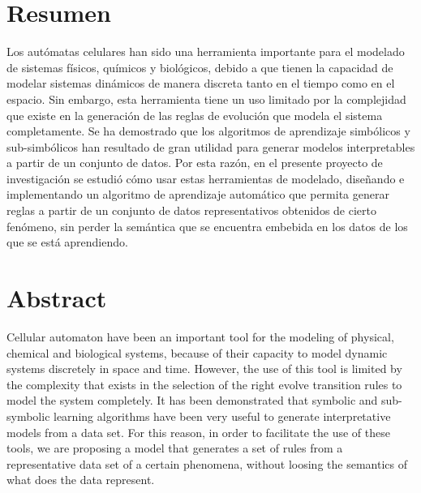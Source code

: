 \pagestyle{plain}
\cleardoublepage
\chapter*{Resumen}
\bigskip
\noindent Los autómatas celulares han sido una herramienta importante para el modelado de sistemas físicos, químicos y biológicos, debido a que tienen la capacidad de modelar sistemas dinámicos de manera discreta tanto en el tiempo como en el espacio. Sin embargo, esta herramienta tiene un uso limitado por la complejidad que existe en la generación de las reglas de evolución que modela el sistema completamente. Se ha demostrado que los algoritmos de aprendizaje simbólicos y sub-simbólicos han resultado de gran utilidad para generar modelos interpretables a partir de un conjunto de datos. Por esta razón, en el presente proyecto de investigación se estudió cómo usar estas herramientas de modelado, diseñando e implementando un algoritmo de aprendizaje automático que permita generar reglas a partir de un conjunto de datos representativos obtenidos de cierto fenómeno, sin perder la semántica que se encuentra embebida en los datos de los que se está aprendiendo.

\bigskip
\bigskip
\chapter*{Abstract}
\bigskip
Cellular automaton have been an important tool for the modeling of physical, chemical and biological systems, because of their capacity to model dynamic systems discretely in space and time. However, the use of this tool is limited by the complexity that exists in the selection of the right evolve transition rules to model the system completely. It has been demonstrated that symbolic and sub-symbolic learning algorithms have been very useful to generate interpretative models from a data set. For this reason, in order to facilitate the use of these tools, we are proposing a model that generates a set of rules from a representative data set of a certain phenomena, without loosing the semantics of what does the data represent.

